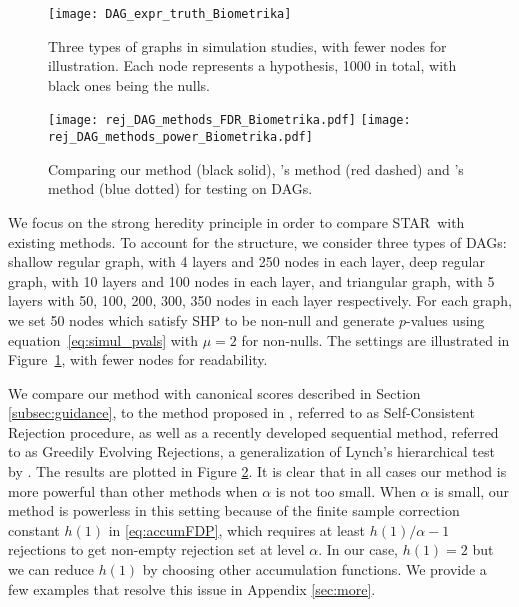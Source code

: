 \documentclass{biometrika}
\renewcommand{\star}{STAR}
\newcommand{\DAG}{DAG}
\newcommand{\1}{\mathbf{1}}
\begin{document}
\begin{figure}[t]
  \centering
  \texttt{[image: DAG\_expr\_truth\_Biometrika]}
  \caption{Three types of graphs in simulation studies, with fewer nodes for illustration. Each node represents a hypothesis, 1000 in total, with black ones being the nulls.}\label{fig:DAG_expr_truth}
\end{figure}


\begin{figure}[t]
  \centering
  \texttt{[image: rej\_DAG\_methods\_FDR\_Biometrika.pdf]}
  \texttt{[image: rej\_DAG\_methods\_power\_Biometrika.pdf]}
  \caption{Comparing our method (black solid), \cite{lynch16}'s method (red dashed) and \cite{ramdas2017dagger}'s method (blue dotted) for testing on \DAG s.}\label{fig:rej_DAG_methods}
\end{figure}

We focus on the strong heredity principle in order to compare \star ~with existing methods. To account for the structure, we consider three types of \DAG s: shallow regular graph, with 4 layers and 250 nodes in each layer, deep regular graph, with 10 layers and 100 nodes in each layer, and triangular graph, with 5 layers with 50, 100, 200, 300, 350 nodes in each layer respectively. For each graph, we set 50 nodes which satisfy SHP to be non-null and generate $p$-values using equation~\eqref{eq:simul_pvals} with $\mu = 2$ for non-nulls. The settings are illustrated in Figure~\ref{fig:DAG_expr_truth}, with fewer nodes for readability.


We compare our method with canonical scores described in Section \ref{subsec:guidance}, to the method proposed in \cite{lynch14}, referred to as Self-Consistent Rejection procedure, as well as a recently developed sequential method, referred to as Greedily Evolving Rejections, a generalization of Lynch's hierarchical test by \cite{ramdas2017dagger}. The results are plotted in Figure \ref{fig:rej_DAG_methods}. It is clear that in all cases our method is more powerful than other methods when $\alpha$ is not too small. When $\alpha$ is small, our method is powerless in this setting because of the finite sample correction constant $h(1)$ in \eqref{eq:accumFDP}, which requires at least $h(1) / \alpha - 1$ rejections to get non-empty rejection set at level $\alpha$. In our case, $h(1) = 2$ but we can reduce $h(1)$ by choosing other accumulation functions. We provide a few examples that resolve this issue in Appendix \ref{sec:more}.
\end{document}
